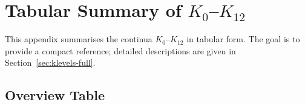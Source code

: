 
\section{Tabular Summary of \texorpdfstring{$K_0$–$K_{12}$}{K0–K12}}
\label{app:klevels-tables}

This appendix summarises the continua \(K_0\)–\(K_{12}\) in tabular form.
The goal is to provide a compact reference; detailed descriptions are given in
Section~\ref{sec:klevels-full}.

\begingroup
\footnotesize
\RaggedRight
\sloppy
\setlength{\tabcolsep}{4pt}

\subsection{Overview Table}

